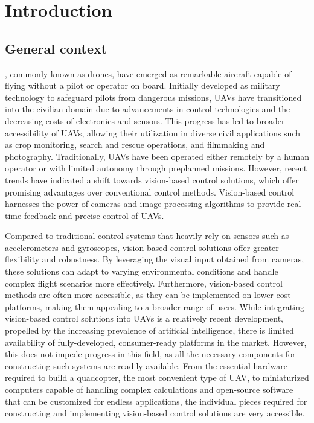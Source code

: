 \chapter{Introduction}
\label{sec:intro}

\section{General context}

, commonly known as drones, have emerged as remarkable aircraft capable of flying without a pilot or operator on board. Initially developed as military technology to safeguard pilots from dangerous missions, UAVs have transitioned into the civilian domain due to advancements in control technologies and the decreasing costs of electronics and sensors. This progress has led to broader accessibility of UAVs, allowing their utilization in diverse civil applications such as crop monitoring, search and rescue operations, and filmmaking and photography.
Traditionally, UAVs have been operated either remotely by a human operator or with limited autonomy through preplanned missions. However, recent trends have indicated a shift towards vision-based control solutions, which offer promising advantages over conventional control methods. Vision-based control harnesses the power of cameras and image processing algorithms to provide real-time feedback and precise control of UAVs.

Compared to traditional control systems that heavily rely on sensors such as accelerometers and gyroscopes, vision-based control solutions offer greater flexibility and robustness. By leveraging the visual input obtained from cameras, these solutions can adapt to varying environmental conditions and handle complex flight scenarios more effectively. Furthermore, vision-based control methods are often more accessible, as they can be implemented on lower-cost platforms, making them appealing to a broader range of users.
While integrating vision-based control solutions into UAVs is a relatively recent development, propelled by the increasing prevalence of artificial intelligence, there is limited availability of fully-developed, consumer-ready platforms in the market. However, this does not impede progress in this field, as all the necessary components for constructing such systems are readily available. From the essential hardware required to build a quadcopter, the most convenient type of UAV, to miniaturized computers capable of handling complex calculations and open-source software that can be customized for endless applications, the individual pieces required for constructing and implementing vision-based control solutions are very accessible.

